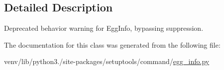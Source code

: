 \subsection{Detailed Description}
\begin{DoxyVerb}Deprecated behavior warning for EggInfo, bypassing suppression.\end{DoxyVerb}
 

The documentation for this class was generated from the following file\+:\begin{DoxyCompactItemize}
\item 
venv/lib/python3./site-\/packages/setuptools/command/\hyperlink{setuptools_2command_2egg__info_8py}{egg\+\_\+info.\+py}\end{DoxyCompactItemize}
